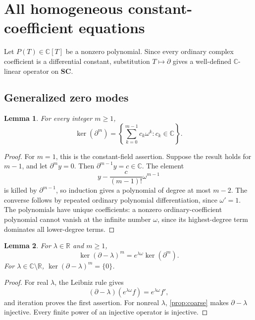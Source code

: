 \documentclass[11pt,letterpaper]{article}
\numberwithin{equation}{section}
\newtheorem{lemma}[lemma]{Lemma}
\theoremstyle{definition}
\theoremstyle{remark}
\newcommand{\SC}{\mathbf{SC}}
\newcommand{\R}{\mathbb R}
\newcommand{\C}{\mathbb C}
\newcommand{\der}{\partial}
\begin{document}
\section{All homogeneous constant-coefficient equations}\label{sec:constant}

Let $P(T)\in\C[T]$ be a nonzero polynomial. Since every ordinary complex coefficient is a differential constant, substitution $T\mapsto\der$ gives a well-defined $\C$-linear operator on $\SC$.

\subsection{Generalized zero modes}
\begin{lemma}\label{lem:kernelpowers}
For every integer $m\geq1$,
\[
 \ker(\der^m)=\left\{\sum_{k=0}^{m-1}c_k\omega^k:c_k\in\C\right\}.
\]
\end{lemma}
\begin{proof}
For $m=1$, this is the constant-field assertion. Suppose the result holds for $m-1$, and let $\der^m y=0$. Then $\der^{m-1}y=c\in\C$. The element
\[
 y-\frac{c}{(m-1)!}\omega^{m-1}
\]
is killed by $\der^{m-1}$, so induction gives a polynomial of degree at most $m-2$. The converse follows by repeated ordinary polynomial differentiation, since $\omega'=1$. The polynomials have unique coefficients: a nonzero ordinary-coefficient polynomial cannot vanish at the infinite number $\omega$, since its highest-degree term dominates all lower-degree terms.
\end{proof}

\begin{lemma}\label{lem:realshift}
For $\lambda\in\R$ and $m\geq1$,
\[
 \ker(\der-\lambda)^m
 =e^{\lambda\omega}\ker(\der^m).
\]
For $\lambda\in\C\setminus\R$, $\ker(\der-\lambda)^m=\{0\}$.
\end{lemma}
\begin{proof}
For real $\lambda$, the Leibniz rule gives
\[
 (\der-\lambda)(e^{\lambda\omega}f)=e^{\lambda\omega}f',
\]
and iteration proves the first assertion. For nonreal $\lambda$, \cref{prop:coarse} makes $\der-\lambda$ injective. Every finite power of an injective operator is injective.
\end{proof}
\end{document}
